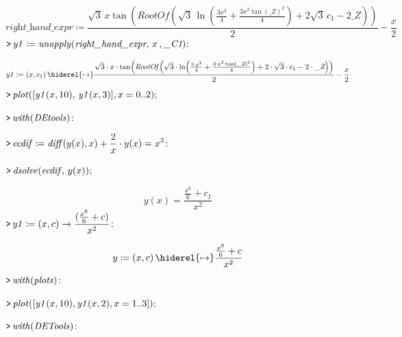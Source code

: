 \documentclass{article}
\begin{document}
\begin{dmath}\label{(9)}
\textit{right\_hand\_expr} \coloneqq \frac{\sqrt{3}\, x \tan \! \left(\mathit{RootOf} \! \left(\sqrt{3}\, \ln \! \left(\frac{3 x^{2}}{4}+\frac{3 x^{2} \tan \left(\textit{\_Z} \right)^{2}}{4}\right)+2 \sqrt{3}\, c_{1}-2 \textit{\_Z} \right)\right)}{2}-\frac{x}{2}
\end{dmath}
\mapleinput
{$ \displaystyle \texttt{>\,} \mathit{y1} \coloneqq \mathit{unapply} (\textit{right\_hand\_expr} ,\,x \,,\textit{\_C1}); $}

\begin{dmath}\label{(10)}
\mathit{y1} \coloneqq \left(x ,c_{1}\right)\hiderel{\mapsto }\frac{\sqrt{3}\cdot x \cdot \tan \! \left(\mathit{RootOf} \! \left(\sqrt{3}\cdot \ln \! \left(\frac{3\cdot x^{2}}{4}+\frac{3\cdot x^{2}\cdot \tan \left(\textit{\_Z} \right)^{2}}{4}\right)+2\cdot \sqrt{3}\cdot c_{1}-2\cdot \textit{\_Z} \right)\right)}{2}-\frac{x}{2}
\end{dmath}
\mapleinput
{$ \displaystyle \texttt{>\,} \mathit{plot} ([\mathit{y1} (x ,10),\,\mathit{y1} (x ,3)],x =0..2); $}

{}
\mapleinput
{$ \displaystyle \texttt{>\,} \mathit{with} (\mathit{DEtools})\colon  $}

\mapleinput
{$ \displaystyle \texttt{>\,} \mathit{ecdif} \coloneqq \mathit{diff} (y (x),x)+\frac{2}{x}\cdot y (x)=x^{3}\colon  $}

\mapleinput
{$ \displaystyle \texttt{>\,} \mathit{dsolve} (\mathit{ecdif} ,\,y (x)); $}

\begin{dmath}\label{(11)}
y \! \left(x \right)=\frac{\frac{x^{6}}{6}+c_{1}}{x^{2}}
\end{dmath}
\mapleinput
{$ \displaystyle \texttt{>\,} \mathit{y1} \coloneqq (x ,c)\rightarrow \frac{(\frac{x^{6}}{6}+c)}{x^{2}}\colon  $}

\begin{dmath}\label{(12)}
y \coloneqq \left(x ,c \right)\hiderel{\mapsto }\frac{\frac{x^{6}}{6}+c}{x^{2}}
\end{dmath}
\mapleinput
{$ \displaystyle \texttt{>\,} \mathit{with} (\mathit{plots})\colon  $}

\mapleinput
{$ \displaystyle \texttt{>\,} \mathit{plot} ([\mathit{y1} (x ,10),\mathit{y1} (x ,2),x =1..3]); $}

{}
\mapleinput
{$ \displaystyle \texttt{>\,} \mathit{with} (\mathit{DETools})\colon  $}
\end{document}
